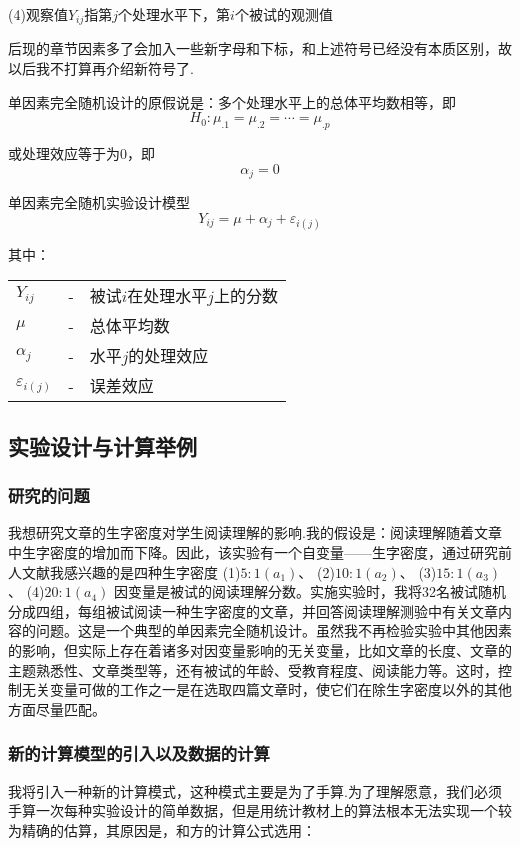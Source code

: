 (4)观察值$Y_{ij}$指第$j$个处理水平下，第$i$个被试的观测值

后现的章节因素多了会加入一些新字母和下标，和上述符号已经没有本质区别，故以后我不打算再介绍新符号了.

单因素完全随机设计的原假说是：多个处理水平上的总体平均数相等，即
$$
H_0: \mu _{.1}=\mu _{.2}=\cdots=\mu _{.p}
$$

或处理效应等于为0，即
$$
\alpha _j=0
$$


单因素完全随机实验设计模型
\begin{equation}
    Y_{ij}=\mu +\alpha _j+\varepsilon _{i\left( j \right)}
\end{equation}

其中：

\begin{tabular}{lcl}
    $Y_{ij}$ & - & 被试$i$在处理水平$j$上的分数 \\
    $\mu$ & - & 总体平均数 \\
    $\alpha _j$ & - & 水平$j$的处理效应 \\
    $\varepsilon_{i \left( j \right)}$ & - & 误差效应 \\
\end{tabular}



\subsection{实验设计与计算举例}

\subsubsection{研究的问题}
我想研究文章的生字密度对学生阅读理解的影响.我的假设是：阅读理解随着文章中生字密度的增加而下降。因此，该实验有一个自变量——生字密度，通过研究前人文献我感兴趣的是四种生字密度
(1)$5:1\left(a_1\right)$、
(2)$10:1\left(a_2\right)$、
(3)$15:1\left(a_3\right)$、
(4)$20:1\left(a_4\right)$
因变量是被试的阅读理解分数。实施实验时，我将32名被试随机分成四组，每组被试阅读一种生字密度的文章，并回答阅读理解测验中有关文章内容的问题。这是一个典型的单因素完全随机设计。虽然我不再检验实验中其他因素的影响，但实际上存在着诸多对因变量影响的无关变量，比如文章的长度、文章的主题熟悉性、文章类型等，还有被试的年龄、受教育程度、阅读能力等。这时，控制无关变量可做的工作之一是在选取四篇文章时，使它们在除生字密度以外的其他方面尽量匹配。

\subsubsection{新的计算模型的引入以及数据的计算}
我将引入一种新的计算模式，这种模式主要是为了手算.为了理解愿意，我们必须手算一次每种实验设计的简单数据，但是用统计教材上的算法根本无法实现一个较为精确的估算，其原因是，和方的计算公式选用：

